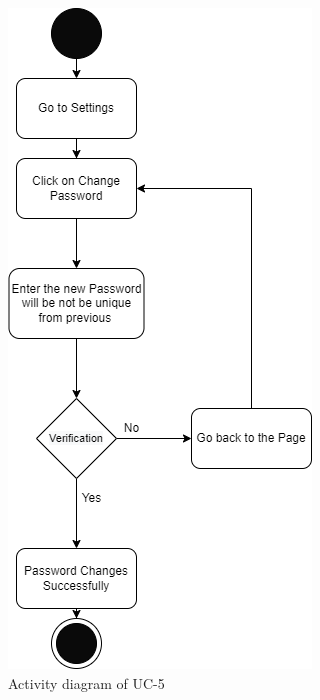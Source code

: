 \begin{figure}[H]
    \centering
    \includegraphics[scale=0.5]{./diagrams/Activity Diagram/ad-05.png}
    \caption{Activity diagram of UC-5}
    \label{fig:act-05}

\end{figure}


